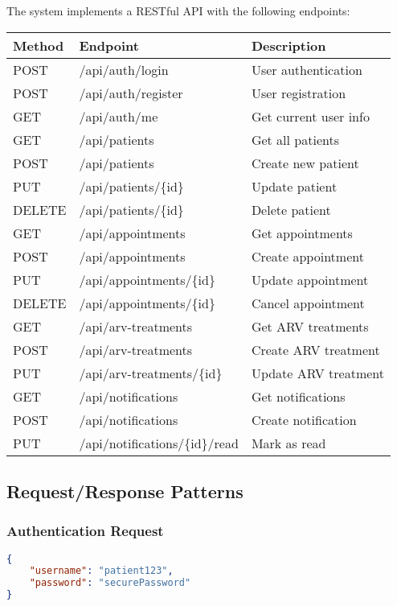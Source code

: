 \documentclass[12pt,a4paper]{article}
\begin{document}
The system implements a RESTful API with the following endpoints:

\begin{longtable}{|p{1.5cm}|p{4cm}|p{8cm}|}
\hline
\textbf{Method} & \textbf{Endpoint} & \textbf{Description} \\
\hline
POST & /api/auth/login & User authentication \\
\hline
POST & /api/auth/register & User registration \\
\hline
GET & /api/auth/me & Get current user info \\
\hline
GET & /api/patients & Get all patients \\
\hline
POST & /api/patients & Create new patient \\
\hline
PUT & /api/patients/\{id\} & Update patient \\
\hline
DELETE & /api/patients/\{id\} & Delete patient \\
\hline
GET & /api/appointments & Get appointments \\
\hline
POST & /api/appointments & Create appointment \\
\hline
PUT & /api/appointments/\{id\} & Update appointment \\
\hline
DELETE & /api/appointments/\{id\} & Cancel appointment \\
\hline
GET & /api/arv-treatments & Get ARV treatments \\
\hline
POST & /api/arv-treatments & Create ARV treatment \\
\hline
PUT & /api/arv-treatments/\{id\} & Update ARV treatment \\
\hline
GET & /api/notifications & Get notifications \\
\hline
POST & /api/notifications & Create notification \\
\hline
PUT & /api/notifications/\{id\}/read & Mark as read \\
\hline
\end{longtable}

\subsection{Request/Response Patterns}

\subsubsection{Authentication Request}
\begin{lstlisting}[language=JSON, caption=Login Request]
{
    "username": "patient123",
    "password": "securePassword"
}
\end{lstlisting}
\end{document}
